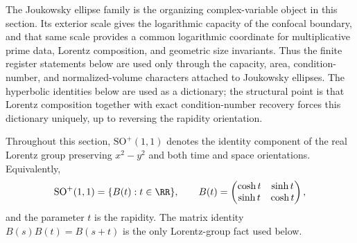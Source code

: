 The Joukowsky ellipse family is the organizing complex-variable object in this section. Its exterior scale gives the logarithmic capacity of the confocal boundary, and that same scale provides a common logarithmic coordinate for multiplicative prime data, Lorentz composition, and geometric size invariants. Thus the finite register statements below are used only through the capacity, area, condition-number, and normalized-volume characters attached to Joukowsky ellipses. The hyperbolic identities below are used as a dictionary; the structural point is that Lorentz composition together with exact condition-number recovery forces this dictionary uniquely, up to reversing the rapidity orientation.

Throughout this section, \(\mathrm{SO}^+(1,1)\) denotes the identity component of the real Lorentz group preserving \(x^2-y^2\) and both time and space orientations.  Equivalently,
\[
\mathrm{SO}^+(1,1)=\{B(t):t\in\RR\},
\qquad
B(t)=\begin{pmatrix}\cosh t&\sinh t\\ \sinh t&\cosh t\end{pmatrix},
\]
and the parameter \(t\) is the rapidity.  The matrix identity \(B(s)B(t)=B(s+t)\) is the only Lorentz-group fact used below.

